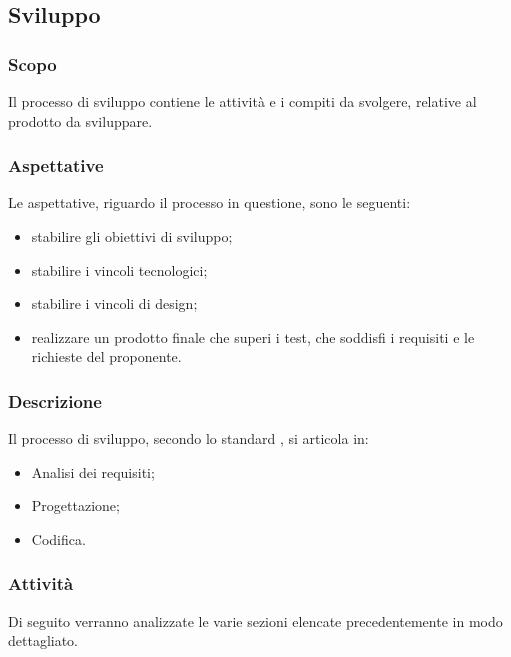 	\subsection{Sviluppo}
		\subsubsection{Scopo}
		Il processo di sviluppo contiene le attività e i compiti da svolgere, relative al prodotto da sviluppare.
		\subsubsection{Aspettative}
		Le aspettative, riguardo il processo in questione, sono le seguenti:
		\begin{itemize}
			\item stabilire gli obiettivi di sviluppo;
			\item stabilire i vincoli tecnologici;
			\item stabilire i vincoli di design;
			\item realizzare un prodotto finale che superi i test, che soddisfi i requisiti e le richieste del proponente.
		\end{itemize}
		\subsubsection{Descrizione}
		Il processo di sviluppo, secondo lo standard , si articola in:
		\begin{itemize}
			\item Analisi dei requisiti;
			\item Progettazione;
			\item Codifica.
		\end{itemize}
		\subsubsection{Attività}
		Di seguito verranno analizzate le varie sezioni elencate precedentemente in modo dettagliato.
